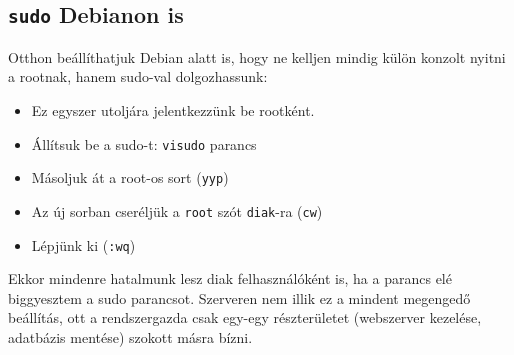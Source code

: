 \documentclass[a4paper]{article}
\newcommand{\code}{\texttt}
\newcommand{\Esc}{\framebox{\texttt{Esc}}}
\begin{document}
\subsection{\code{sudo} Debianon is}
Otthon beállíthatjuk Debian alatt is, hogy ne kelljen mindig külön
konzolt nyitni a rootnak, hanem sudo-val dolgozhassunk:
\begin{itemize}
\item Ez egyszer utoljára jelentkezzünk be rootként.
\item Állítsuk be a sudo-t: \code{visudo} parancs
\item Másoljuk át a root-os sort (\code{yyp})
\item Az új sorban cseréljük a \code{root} szót \code{diak}-ra (\code{cw})
\item Lépjünk ki (\code{\Esc:wq})
\end{itemize}
Ekkor mindenre hatalmunk lesz diak felhasználóként is, ha a parancs elé
biggyesztem a sudo parancsot. Szerveren nem illik ez a mindent
megengedő beállítás, ott a rendszergazda csak egy-egy részterületet
(webszerver kezelése, adatbázis mentése) szokott másra bízni.

\newpage
\tableofcontents
\end{document}
